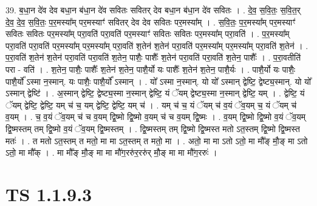 \documentclass[17pt]{extarticle}
\begin{document}
39. ब॒धा॒न दे॑व देव बधा॒न ब॑धा॒न दे॑व सवितः सवितर् देव बधा॒न ब॑धा॒न दे॑व सवितः । . दे॒व॒ स॒वि॒तः॒ स॒वि॒त॒र् दे॒व॒ दे॒व॒ स॒वि॒तः॒ प॒र॒मस्या᳚म् पर॒मस्याꣳ॑ सवितर् देव देव सवितः पर॒मस्या᳚म् । . स॒वि॒तः॒ प॒र॒मस्या᳚म् पर॒मस्याꣳ॑ सवितः सवितः पर॒मस्या᳚म् परा॒वति॑ परा॒वति॑ पर॒मस्याꣳ॑ सवितः सवितः पर॒मस्या᳚म् परा॒वति॑ । . प॒र॒मस्या᳚म् परा॒वति॑ परा॒वति॑ पर॒मस्या᳚म् पर॒मस्या᳚म् परा॒वति॑ श॒तेन॑ श॒तेन॑ परा॒वति॑ पर॒मस्या᳚म् पर॒मस्या᳚म् परा॒वति॑ श॒तेन॑ । . प॒रा॒वति॑ श॒तेन॑ श॒तेन॑ परा॒वति॑ परा॒वति॑ श॒तेन॒ पाशैः॒ पाशैः᳚ श॒तेन॑ परा॒वति॑ परा॒वति॑ श॒तेन॒ पाशैः᳚ । . प॒रा॒वतीति॑ परा - वति॑ । . श॒तेन॒ पाशैः॒ पाशैः᳚ श॒तेन॑ श॒तेन॒ पाशै॒र्यो यः पाशैः᳚ श॒तेन॑ श॒तेन॒ पाशै॒र्यः । . पाशै॒र्यो यः पाशैः॒ पाशै॒र्यो᳚ ऽस्मा न॒स्मान्. यः पाशैः॒ पाशै॒र्यो᳚ ऽस्मान् । . यो᳚ ऽस्मा न॒स्मान्. यो यो᳚ ऽस्मान् द्वेष्टि॒ द्वेष्ट्य॒स्मान्. यो यो᳚ ऽस्मान् द्वेष्टि॑ । . अ॒स्मान् द्वेष्टि॒ द्वेष्ट्य॒स्मा न॒स्मान् द्वेष्टि॒ यं ॅयम् द्वेष्ट्य॒स्मा न॒स्मान् द्वेष्टि॒ यम् । . द्वेष्टि॒ यं ॅयम् द्वेष्टि॒ द्वेष्टि॒ यम् च॑ च॒ यम् द्वेष्टि॒ द्वेष्टि॒ यम् च॑ । . यम् च॑ च॒ यं ॅयम् च॑ व॒यं ॅव॒यम् च॒ यं ॅयम् च॑ व॒यम् । . च॒ व॒यं ॅव॒यम् च॑ च व॒यम् द्वि॒ष्मो द्वि॒ष्मो व॒यम् च॑ च व॒यम् द्वि॒ष्मः । . व॒यम् द्वि॒ष्मो द्वि॒ष्मो व॒यं ॅव॒यम् द्वि॒ष्मस्तम् तम् द्वि॒ष्मो व॒यं ॅव॒यम् द्वि॒ष्मस्तम् । . द्वि॒ष्मस्तम् तम् द्वि॒ष्मो द्वि॒ष्मस्त मतो ऽत॒स्तम् द्वि॒ष्मो द्वि॒ष्मस्त मतः॑ । . त मतो ऽत॒स्तम् त मतो॒ मा मा ऽत॒स्तम् त मतो॒ मा । . अतो॒ मा मा ऽतो ऽतो॒ मा मौ᳚ङ् मौ॒ङ् मा ऽतो ऽतो॒ मा मौ᳚क् । . मा मौ᳚ङ् मौ॒ङ् मा मा मौ॑ग॒ररु॑र॒ररु॑र् मौ॒ङ् मा मा मौ॑ग॒ररुः॑ । \newline
\pagebreak
{}
\section*{ TS 1.1.9.3 }
\end{document}
